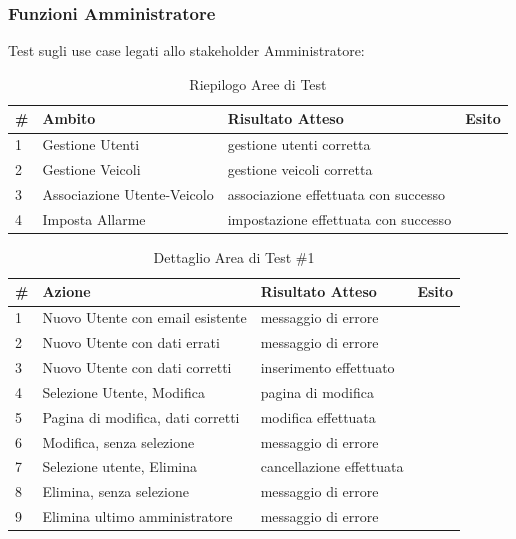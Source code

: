 \documentclass[a4paper,12pt]{article}
\begin{document}
\subsubsection{Funzioni Amministratore}
Test sugli use case legati allo stakeholder Amministratore:

\begin{table}[H]
\begin{center}
\caption{Riepilogo Aree di Test}
\begin{tabular}{l l l l}
\rowcolor{Ash}
\hline
\# & Ambito & Risultato Atteso & Esito \\ \hline
1 & Gestione Utenti				&		gestione utenti corretta				&\cellcolor{green}{OK}\\
2 & Gestione Veicoli				&		gestione veicoli corretta				&\cellcolor{green}{OK}\\
3 & Associazione Utente-Veicolo	&		associazione effettuata con successo	&\cellcolor{green}{OK}\\
4 & Imposta Allarme				&		impostazione effettuata con successo	& \cellcolor{green}{OK}\\ \hline
\end{tabular}
\end{center}
\end{table}

\begin{table}[H]
\begin{center}
\caption{Dettaglio Area di Test \#1}
\begin{tabular}{p{0.5cm} p{6.5cm} p{5cm} p{1cm}}
\rowcolor{Ash}
\hline
\# & Azione & Risultato Atteso & Esito \\ \hline
1 & Nuovo Utente con email esistente				&		messaggio di errore		&\cellcolor{green}{OK}\\
2 & Nuovo Utente con dati errati					&		messaggio di errore		&\cellcolor{green}{OK}\\
3 & Nuovo Utente con dati corretti					&		inserimento effettuato	&\cellcolor{green}{OK}\\
4 & Selezione Utente, Modifica						&		pagina di modifica		&\cellcolor{green}{OK}\\
5 & Pagina di modifica, dati corretti					&		modifica effettuata		&\cellcolor{green}{OK}\\
6 & Modifica, senza selezione						&		messaggio di errore		&\cellcolor{green}{OK}\\
7 & Selezione utente, Elimina						&		cancellazione effettuata	&\cellcolor{green}{OK}\\
8 & Elimina, senza selezione						&		messaggio di errore		&\cellcolor{green}{OK}\\
9 & Elimina ultimo amministratore					&		messaggio di errore		&\cellcolor{green}{OK}\\ \hline
\end{tabular}{}
\end{center}
\end{table}
\end{document}
